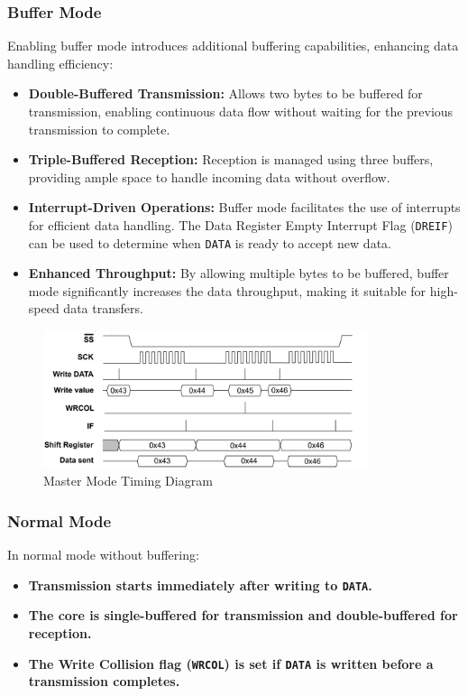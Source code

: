 \documentclass{article}
\begin{document}
\subsubsection{Buffer Mode}
Enabling buffer mode introduces additional buffering capabilities, enhancing data handling efficiency:

\begin{itemize}
    \item \textbf{Double-Buffered Transmission:} Allows two bytes to be buffered for transmission, enabling continuous data flow without waiting for the previous transmission to complete.
    \item \textbf{Triple-Buffered Reception:} Reception is managed using three buffers, providing ample space to handle incoming data without overflow.
    \item \textbf{Interrupt-Driven Operations:} Buffer mode facilitates the use of interrupts for efficient data handling. The Data Register Empty Interrupt Flag (\texttt{DREIF}) can be used to determine when \texttt{DATA} is ready to accept new data.
    \item \textbf{Enhanced Throughput:} By allowing multiple bytes to be buffered, buffer mode significantly increases the data throughput, making it suitable for high-speed data transfers.
\end{itemize}

\begin{figure}[H]
    \centering
    \includegraphics[width=0.85\textwidth]{images/spi_master_timing.png}
    \caption{Master Mode Timing Diagram}
    \label{fig:spi_master_timing}
\end{figure}

\subsubsection{Normal Mode}
In normal mode without buffering:

\begin{itemize}
    \item \textbf{Transmission starts immediately after writing to \texttt{DATA}.}
    \item \textbf{The core is single-buffered for transmission and double-buffered for reception.}
    \item \textbf{The Write Collision flag (\texttt{WRCOL}) is set if \texttt{DATA} is written before a transmission completes.}
\end{itemize}
\end{document}
